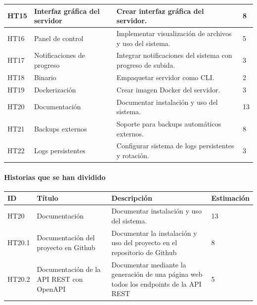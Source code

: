 \begin{tabularx}{\textwidth}{|l|l|>{\raggedright\arraybackslash}X|l|}
    \hline
    HT15 & Interfaz gráfica del servidor & Crear interfaz gráfica del servidor. & 8 \\
    \hline
    HT16 & Panel de control & Implementar visualización de archivos y uso del sistema. & 5 \\
    \hline
    HT17 & Notificaciones de progreso & Integrar notificaciones del sistema con progreso de subida. & 3 \\
    \hline
    HT18 & Binario & Empaquetar servidor como CLI. & 2 \\
    \hline
    HT19 & Dockerización & Crear imagen Docker del servidor. & 3 \\
    \hline
    HT20 & Documentación & Documentar instalación y uso del sistema. & 13 \\
    \hline
    HT21 & Backups externos & Soporte para backups automáticos externos. & 8 \\
    \hline
    HT22 & Logs persistentes & Configurar sistema de logs persistentes y rotación. & 3 \\
    \hline
\end{tabularx}

\paragraph{Historias que se han dividido}

\begin{table}[h!]
    \begin{center}
        \begin{tabularx}{\textwidth}{|l|X|>{\raggedright\arraybackslash}X|l|}
            \hline
            ID & Título & Descripción & Estimación \\
            \hline
            HT20 & Documentación & Documentar instalación y uso del sistema. & 13 \\
            \hline
            HT20.1 & Documentación del proyecto en Github & Documentar la instalación y uso del proyecto en el repositorio de Github & 8 \\
            \hline
            HT20.2 &  Documentación de la API REST con OpenAPI & Documentar mediante la generación de una página web todos los endpoints de la API REST & 5 \\
            \hline
        \end{tabularx}
    \end{center}
\end{table}

\newpage
